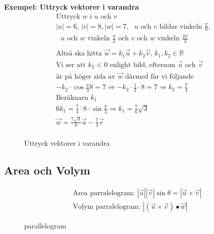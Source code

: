 \begin{multicols}{2}
\textbf{Exempel: Uttryck vektorer i varandra}
\begin{align*}
  &\text{Uttryck $w$ i $u$ och $v$} \\
  &|u|=6, \, |v|=8, |w|=7, \text{ $u$ och $v$ bildar vinkeln } \frac{\pi}{6}, \\
  &\text{ $u$ och $w$ vinkeln } \frac{\pi}{2} \text{ och $v$ och $w$ vinkeln } 
  \frac{2\pi}{3}  \\
  &\\
  &\text{Altså ska hitta } \vec{w}=k_1\vec{u}+k_2\vec{v}, \, k_1,k_2\in\mathbb{R} \\
  &\text{Vi ser att $k_2<0$ enlight bild, eftersom $\vec{u}$ och $\vec{v}$} \\
  &\text{är på höger sida av $\vec{w}$ därmed får vi följande } \\
  &-k_2\cdot\cos{\frac{\pi}{3}}8=7 \Rightarrow -k_2\cdot{\frac{1}{2}}\cdot{8}=7
  \Rightarrow k_2=\frac{7}{4} \\
  &\text{Beräknarn $k_1$ } \\
  &6k_1=\frac{7}{4}\cdot{8}\cdot{\sin{\frac{\pi}{3}}} \Rightarrow k_1=\frac{7}{6}\sqrt{3} \\
  &\vec{w}=\frac{7\sqrt{3}}{6}\vec{u}-\frac{7}{4}\vec{v} \\
\end{align*}
\begin{figure}[H]
    \centering
    
    \caption{Uttryck vektorer i varandra}
\end{figure}


\subsection{Area och Volym}
\begin{align*} 
  &\quad  \text{Area parralelogram: } |\vec{u}||\vec{v}|\sin{\theta} = |\vec{u}\times\vec{v}| \\
  &\quad  \text{Volym parralelogram: } |(\vec{u}\times\vec{v})\bullet\vec{w}|
\end{align*}

\begin{figure}[H]
    \centering
    
    \caption{parallelogram}
\end{figure}


\end{multicols}
